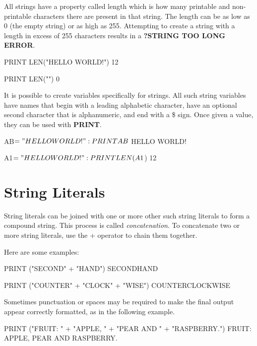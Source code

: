 All strings have a property called length which is how many printable and non-printable characters there are present in that string. The length can be as low as 0 (the empty string) or as high as 255. Attempting to create a string with a length in excess of 255 characters results in a {\bf ?STRING TOO LONG ERROR}.

\begin{screenoutput}
PRINT LEN("HELLO WORLD!")
 12
\end{screenoutput}

\begin{screenoutput}
PRINT LEN("")
 0
\end{screenoutput}

It is possible to create variables specifically for strings. All such string variables have names that begin with a leading alphabetic character, have an optional second character that is alphanumeric, and end with a \$ sign. Once given a value, they can be used with {\bf PRINT}.

\begin{screenoutput}
AB$ = "HELLO WORLD!": PRINT AB$
HELLO WORLD!
\end{screenoutput}

\begin{screenoutput}
A1$ = "HELLO WORLD!": PRINT LEN(A1$)
 12
\end{screenoutput}

\section{String Literals}
String literals can be joined with one or more other such string literals to form a compound string. This process is called {\it concatenation}. To concatenate two or more string literals, use the + operator to chain them together.

Here are some examples:

\begin{screenoutput}
PRINT ("SECOND" + "HAND")
SECONDHAND
\end{screenoutput}

\begin{screenoutput}
PRINT ("COUNTER" + "CLOCK" + "WISE")
COUNTERCLOCKWISE
\end{screenoutput}

Sometimes punctuation or spaces may be required to make the final output appear correctly formatted, as in the following example.

\begin{screenoutput}
PRINT ("FRUIT: " + "APPLE, " + "PEAR AND " + "RASPBERRY.")
FRUIT: APPLE, PEAR AND RASPBERRY.
\end{screenoutput}


